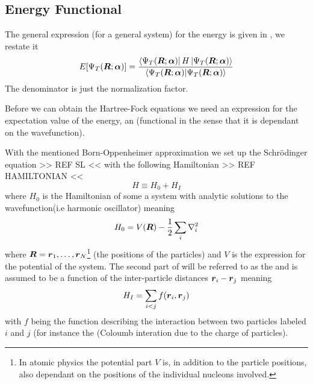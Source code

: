     \subsection{Energy Functional}
        The general expression (for a general system) for the energy is given
        in , we restate it
            \begin{equation}
                E[{\Psi}_T(\boldsymbol{{R}};\boldsymbol{{\alpha}})] = \frac{\bra{{\Psi}_T(\boldsymbol{{R}};\boldsymbol{{\alpha}})}H\ket{{\Psi}_T(\boldsymbol{{R}};\boldsymbol{{\alpha}})}}{\braket{{\Psi}_T(\boldsymbol{{R}};\boldsymbol{{\alpha}})}}
                \label{eq:energyFunc}
            \end{equation}
        The denominator is just the normalization factor.

        Before we can obtain the Hartree-Fock equations we need an expression
        for the expectation value of the energy, an 
        (functional in the sense that it is dependant on the wavefunction).

        With the mentioned Born-Oppenheimer approximation we set up the
        Schrödinger equation >> REF SL << with the following Hamiltonian >> REF
        HAMILTONIAN <<
            \begin{equation}
                H \equiv H_0 + H_I
                \label{eq:hamiltoninandef}
            \end{equation}
        where $H_0$ is the Hamiltonian of some a system with analytic solutions
        to the wavefunction(i.e harmonic oscillator) meaning
            \begin{equation}
                H_0 = V(\boldsymbol{{R}}) - \frac{1}{2}\sum_i\nabla^2_i
            \end{equation}
        where $\boldsymbol{{R}}=\boldsymbol{{r}}_1,\dots,\boldsymbol{{r}}_N$\footnote{In atomic physics
        the potential part $V$ is, in addition to the particle positions, also
        dependant on the positions of the individual nucleons involved.} (the
        positions of the particles) and $V$ is the expression for the potential
        of the system.  The second part of  will be
        referred to as the  and is assumed to be
        a function of the inter-particle distances $\boldsymbol{{r}}_i-\boldsymbol{{r}}_j$
        meaning
            \begin{equation}
                H_I = \sum\limits_{i<j} f(\boldsymbol{{r}}_i, \boldsymbol{{r}}_j)
            \end{equation}
        with $f$ being the function describing the interaction between two
        particles labeled $i$ and $j$ (for instance the (Coloumb interation due
        to the charge of particles).

